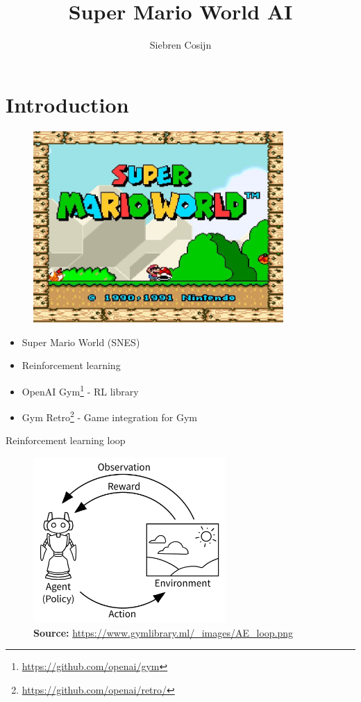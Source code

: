 \documentclass{article}
\title{Super Mario World AI}
\author{Siebren Cosijn}
\begin{document}
    \maketitle

    \section{Introduction}
    \begin{figure}[H]
        \centering
        \includegraphics[width=0.85\textwidth]{start-screen}
    \end{figure}
    \begin{itemize}
        \item Super Mario World (SNES)
        \item Reinforcement learning
        \item OpenAI Gym\footnote{\url{https://github.com/openai/gym}} - RL library
        \item Gym Retro\footnote{\url{https://github.com/openai/retro/}} - Game integration for Gym
    \end{itemize}
    Reinforcement learning loop
    \begin{figure}[H]
        \centering
        \includegraphics[width=0.65\textwidth]{AE_loop}
        \caption{\textbf{Source:} \url{https://www.gymlibrary.ml/_images/AE_loop.png}}
        \label{fig:loop}
    \end{figure}
\end{document}
